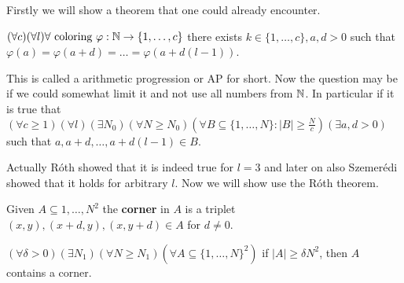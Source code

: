Firstly we will show a theorem that one could already encounter.

\begin{thm}
	$(\forall c) (\forall l) \forall \text{ coloring } \varphi : \mathbb{N} \to \{1, \dots, c\}$ there exists $k \in \{1, \dots, c\}, a, d > 0$ such that $\varphi(a) = \varphi(a + d) = \dots = \varphi(a + d(l -1))$.
\end{thm}

This is called a arithmetic progression or AP for short. Now the question may be if we could somewhat limit it and not use all numbers from $\mathbb{N}$. In particular if it is true that $(\forall c \geq 1) (\forall l) (\exists N_0) (\forall N \geq N_0) (\forall B \subseteq \{1, \dots, N\} : |B| \geq \frac{N}{c}) (\exists a, d> 0)$ such that $a, a+d, \dots, a+d(l-1) \in B$.

Actually Róth showed that it is indeed true for $l = 3$ and later on also Szemerédi showed that it holds for arbitrary $l$. Now we will show use the Róth theorem.

\begin{defn}
	Given $A \subseteq {1, \dots, N}^2$ the \textbf{corner} in $A$ is a triplet $(x,y), (x+d,y), (x, y+d) \in A$ for $d \neq 0$.
\end{defn}

\begin{lemma}
	$(\forall \delta > 0) (\exists N_1)(\forall N \geq N_1) (\forall A \subseteq \{1, \dots, N\}^2)$ if $|A| \geq \delta N^2$, then $A$ contains a corner.
\end{lemma}

